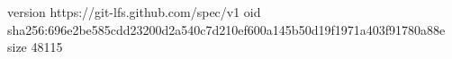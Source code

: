 version https://git-lfs.github.com/spec/v1
oid sha256:696e2be585cdd23200d2a540c7d210ef600a145b50d19f1971a403f91780a88e
size 48115
